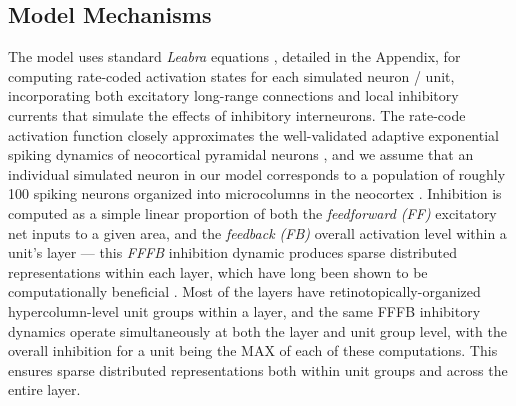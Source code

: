 \documentclass[11pt,twoside]{article}
\newif\myifpdf
\begin{document}
\subsection{Model Mechanisms}
\underline{
}The model uses standard {\em Leabra} equations \cite{OReillyHazyHerd16,OReillyMunakataFrankEtAl12,OReillyMunakata00}, detailed in the Appendix, for computing rate-coded activation states for each simulated neuron / unit, incorporating both excitatory long-range connections and local inhibitory currents that simulate the effects of inhibitory interneurons.  The rate-code activation function closely approximates the well-validated adaptive exponential spiking dynamics of neocortical pyramidal neurons \cite{BretteGerstner05}, and we assume that an individual simulated neuron in our model corresponds to a population of roughly 100 spiking neurons organized into microcolumns in the neocortex \cite{BuxhoevedenCasanova02,Mountcastle57,Mountcastle97,RaoWilliamsGoldman-Rakic99}.  Inhibition is computed as a simple linear proportion of both the {\em feedforward (FF)} excitatory net inputs to a given area, and the {\em feedback (FB)} overall activation level within a unit's layer --- this {\em FFFB} inhibition dynamic produces sparse distributed representations within each layer, which have long been shown to be computationally beneficial \cite{Kanerva88,Barlow89,Field94,OlshausenField97}.  Most of the layers have retinotopically-organized hypercolumn-level unit groups within a layer, and the same FFFB inhibitory dynamics operate simultaneously at both the layer and unit group level, with the overall inhibition for a unit being the MAX of each of these computations.  This ensures sparse distributed representations both within unit groups and across the entire layer.
\end{document}
